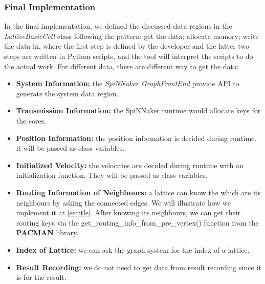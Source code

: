 \subsubsection{Final Implementation}
In the final implementation, we defined the discussed data regions in the \textit{LatticeBasicCell} class following the pattern: get the data; allocate memory; write the data in, where the first step is defined by the developer and the latter two steps are written in Python scripts, and the tool will interpret the scripts to do the actual work. For different data, there are different way to get the data:

\begin{itemize}
    \item \textbf{System Information:} the \textit{SpiNNaker GraphFrontEnd} provide API to generate the system data region.
    \item \textbf{Transmission Information:} the SpiNNaker runtime would allocate keys for the cores.
    \item \textbf{Position Information:} the position information is decided during runtime. it will be passed as class variables.
    \item \textbf{Initialized Velocity:} the velocities are decided during runtime with an initialization function. They will be passed as class variables. 
    \item \textbf{Routing Information of Neighbours:} a lattice can know the which are its neighbours by asking the connected edges. We will illustrate how we implement it at \ref{sec:tle}. After knowing its neighbours, we can get their routing keys via the get\_routing\_info\_from\_pre\_vertex() function from the \textbf{PACMAN} library.
    \item \textbf{Index of Lattice:} we can ask the graph system for the index of a lattice.
    \item \textbf{Result Recording:} we do not need to get data from result recording since it is for the result.
\end{itemize}

